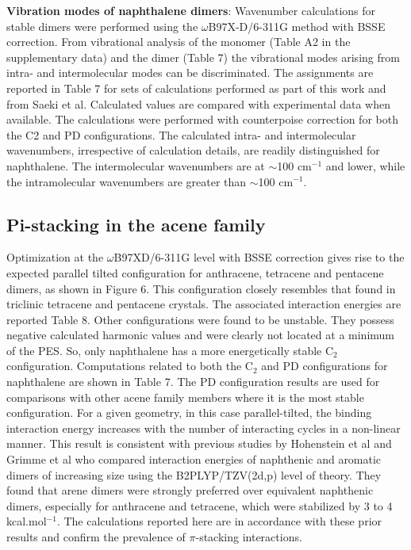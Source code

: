 \textbf{Vibration modes of naphthalene dimers}: Wavenumber calculations for stable dimers were performed using the $\omega$B97X-D/6-311G method with BSSE correction. From vibrational analysis of the monomer (Table A2 in the supplementary data) and the dimer (Table 7) the vibrational modes arising from intra- and intermolecular modes can be discriminated. The assignments are reported in Table 7 for sets of calculations performed as part of this work and from Saeki et al\cite{saeki2006theoretical}. Calculated values are compared with experimental data when available. The calculations were performed with counterpoise correction for both the C2 and PD configurations. The calculated intra- and intermolecular wavenumbers, irrespective of calculation details, are readily distinguished for naphthalene. The intermolecular wavenumbers are at $\sim$100 cm$^{-1}$ and lower, while the intramolecular wavenumbers are greater than $\sim$100 cm$^{-1}$.

\subsection{Pi-stacking in the acene family}

Optimization at the $\omega$B97XD/6-311G level with BSSE correction gives rise to the expected parallel tilted configuration \cite{brock1990temperature} for anthracene, tetracene and pentacene dimers, as shown in Figure 6. This configuration closely resembles that found in triclinic tetracene\cite{campbell1962crystal} and pentacene\cite{holmes1999nature} crystals. The associated interaction energies are reported Table 8.  Other configurations were found to be unstable. They possess negative calculated harmonic values and were clearly not located at a minimum of the PES. So, only naphthalene has a more energetically stable C$_{2}$ configuration. Computations related to both the C$_{2}$ and PD configurations for naphthalene are shown in Table 7. The PD configuration results are used for comparisons with other acene family members where it is the most stable configuration.
For a given geometry, in this case parallel-tilted, the binding interaction energy increases with the number of interacting cycles in a non-linear manner. This result is consistent with previous studies by Hohenstein et al \cite{hohenstein2010density} and Grimme et al\cite{grimme2008special} who compared interaction energies of naphthenic and aromatic dimers of increasing size using the B2PLYP/TZV(2d,p) level of theory. They found that arene dimers were strongly preferred over equivalent naphthenic dimers, especially for anthracene and tetracene, which were stabilized by 3 to 4 kcal.mol$^{-1}$. The calculations reported here are in accordance with these prior results and confirm the prevalence of $\pi$-stacking interactions.  

